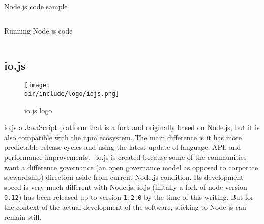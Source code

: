\begin{listing}[!h]
\caption{Node.js code sample}
\inputminted{javascript}{\dir/include/node-sample.js}
\label{lst:node-sample}
\end{listing}

\begin{listing}[!h]
\caption{Running Node.js code}
\inputminted{shell-session}{\dir/include/node-run.shell-session}
\label{lst:node-run}
\end{listing}


\clearpage

\subsection{io.js}

\begin{wrapfigure}{r}{0.5\textwidth}
  \vspace{-20pt}
  \begin{center}
    \texttt{[image: \\dir/include/logo/iojs.png]}
  \end{center}
  \vspace{-20pt}
  \caption{io.js logo}
  \label{fig:iojs-logo}
  \vspace{-10pt}
\end{wrapfigure}

io.js a JavaScript platform that is a fork and originally based on Node.js, but it is also compatible with the \ac{npm} ecosystem.
The main difference is it has more predictable release cycles and using the latest update of language, API, and performance improvements.~\autocite{iojs:2015}
io.js is created because some of the communities want a difference governance (an open governance model as opposed to corporate stewardship) direction aside from current Node.js condition.
Its development speed is very much different with Node.js, io.js (initally a fork of node version \verb|0.12|) has been released up to version \verb|1.2.0| by the time of this writing.
But for the context of the actual development of the software, sticking to Node.js can remain still.
